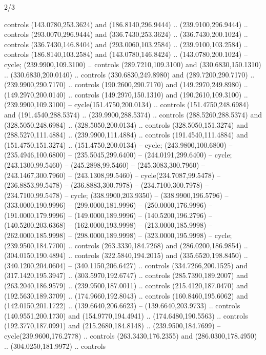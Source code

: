 \begin{flagdescription}{2/3}
\begin{scope}[yshift=0.5\flagwidth,xshift=0.4\flaglength,y=0.00183\flagwidth,x=0.00183\flagwidth,yscale=-1,inner sep=0pt,outer sep=0pt]
\begin{scope}[xshift=-0.517\flagwidth,yshift=-0.285\flagwidth]
\begin{scope}[cm={{1.42403,0.0,0.0,1.42403,(-59.10036,-127.66903)}},draw=black,fill=gold,line join=round,line cap=round,even odd rule,line width=0.0015\flagwidth]
  controls (143.0780,253.3624) and (186.8140,296.9444) .. (239.9100,296.9444) ..
  controls (293.0070,296.9444) and (336.7430,253.3624) .. (336.7430,200.1024) ..
  controls (336.7430,146.8404) and (293.0060,103.2584) .. (239.9100,103.2584) ..
  controls (186.8140,103.2584) and (143.0780,146.8424) .. (143.0780,200.1024) --
  cycle;
 (239.9900,109.3100) .. controls (289.7210,109.3100) and
  (330.6830,150.1310) .. (330.6830,200.0140) .. controls (330.6830,249.8980) and
  (289.7200,290.7170) .. (239.9900,290.7170) .. controls (190.2600,290.7170) and
  (149.2970,249.8980) .. (149.2970,200.0140) .. controls (149.2970,150.1310) and
  (190.2610,109.3100) .. (239.9900,109.3100) -- cycle(151.4750,200.0134) ..
  controls (151.4750,248.6984) and (191.4540,288.5374) .. (239.9900,288.5374) ..
  controls (288.5260,288.5374) and (328.5050,248.6984) .. (328.5050,200.0134) ..
  controls (328.5050,151.3274) and (288.5270,111.4884) .. (239.9900,111.4884) ..
  controls (191.4540,111.4884) and (151.4750,151.3274) .. (151.4750,200.0134) --
  cycle;
  (243.9800,100.6800) -- (235.4946,100.6800) --
  (235.5045,299.6400) -- (244.0191,299.6400) -- cycle;
 (243.1300,99.5460) -- (245.2898,99.5460) -- (245.3083,300.7960)
  -- (243.1467,300.7960) -- (243.1308,99.5460) -- cycle(234.7087,99.5478) --
  (236.8853,99.5478) -- (236.8883,300.7978) -- (234.7100,300.7978) --
  (234.7100,99.5478) -- cycle;
  (338.9900,203.9350) -- (338.9900,196.5796) --
  (333.0000,190.9996) -- (299.0000,181.9996) -- (250.0000,176.9996) --
  (191.0000,179.9996) -- (149.0000,189.9996) -- (140.5200,196.2796) --
  (140.5200,203.6368) -- (162.0000,193.9998) -- (213.0000,185.9998) --
  (262.0000,185.9998) -- (298.0000,189.9998) -- (323.0000,195.9998) -- cycle;
  (239.9500,184.7700) .. controls (263.3330,184.7268) and
  (286.0200,186.9854) .. (304.0150,190.4894) .. controls (322.5840,194.2015) and
  (335.6520,198.8450) .. (340.1200,204.0604) -- (340.1150,206.6427) .. controls
  (334.7266,200.1525) and (317.1420,195.3947) .. (303.5970,192.6747) .. controls
  (285.7390,189.2007) and (263.2040,186.9579) .. (239.9500,187.0011) .. controls
  (215.4120,187.0470) and (192.5630,189.3709) .. (174.9660,192.8043) .. controls
  (160.8460,195.6062) and (142.0150,201.1722) .. (139.6640,206.6623) --
  (139.6640,203.9733) .. controls (140.9551,200.1730) and (154.9770,194.4941) ..
  (174.6480,190.5563) .. controls (192.3770,187.0991) and (215.2680,184.8148) ..
  (239.9500,184.7699) -- cycle(239.9600,176.2778) .. controls
  (263.3430,176.2355) and (286.0300,178.4950) .. (304.0250,181.9972) .. controls

\end{scope}
\end{scope}
\end{scope}
\end{flagdescription}
